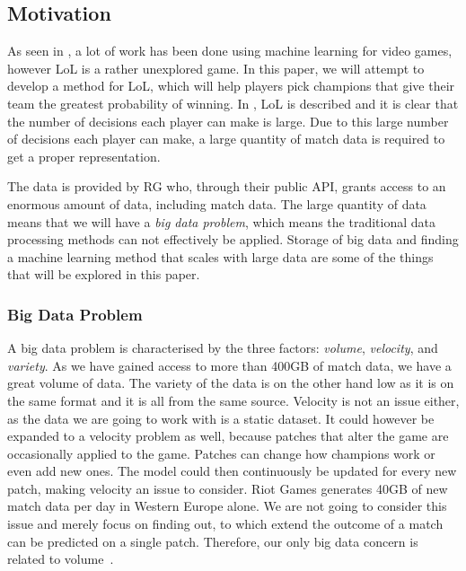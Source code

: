\subsection{Motivation}\label{sec:motivation}
As seen in , a lot of work has been done using machine learning for video games, however LoL is a rather unexplored game. 
In this paper, we will attempt to develop a method for LoL, which will help players pick champions that give their team the greatest probability of winning. In , LoL is described and it is clear that the number of decisions each player can make is large. Due to this large number of decisions each player can make, a large quantity of match data is required to get a proper representation. 

The data is provided by RG who, through their public API, grants access to an enormous amount of data, including match data.
The large quantity of data means that we will have a \emph{big data problem}, which means the traditional data processing methods can not effectively be applied. Storage of big data and finding a machine learning method that scales with large data are some of the things that will be explored in this paper.

\subsubsection{Big Data Problem}\label{sec:big_data_problem}
A big data problem is characterised by the three factors: \emph{volume}, \emph{velocity}, and \emph{variety}. As we have gained access to more than 400GB of match data, we have a great volume of data. The variety of the data is on the other hand low as it is on the same format and it is all from the same source. Velocity is not an issue either, as the data we are going to work with is a static dataset. It could however be expanded to a velocity problem as well, because patches that alter the game are occasionally applied to the game. Patches can change how champions work or even add new ones. The model could then continuously be updated for every new patch, making velocity an issue to consider. Riot Games generates 40GB of new match data per day in Western Europe alone. We are not going to consider this issue and merely focus on finding out, to which extend the outcome of a match can be predicted on a single patch. Therefore, our only big data concern is related to volume~\cite{madden2012databases}.

